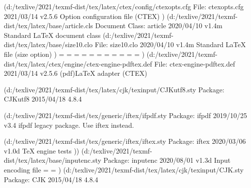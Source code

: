 (d:/texlive/2021/texmf-dist/tex/latex/ctex/config/ctexopts.cfg
File: ctexopts.cfg 2021/03/14 v2.5.6 Option configuration file (CTEX)
)
(d:/texlive/2021/texmf-dist/tex/latex/base/article.cls
Document Class: article 2020/04/10 v1.4m Standard LaTeX document class
(d:/texlive/2021/texmf-dist/tex/latex/base/size10.clo
File: size10.clo 2020/04/10 v1.4m Standard LaTeX file (size option)
)
\c@part=
\c@section=
\c@subsection=
\c@subsubsection=
\c@paragraph=
\c@subparagraph=
\c@figure=
\c@table=
\abovecaptionskip=
\belowcaptionskip=
\bibindent=
)
(d:/texlive/2021/texmf-dist/tex/latex/ctex/engine/ctex-engine-pdftex.def
File: ctex-engine-pdftex.def 2021/03/14 v2.5.6 (pdf)LaTeX adapter (CTEX)

(d:/texlive/2021/texmf-dist/tex/latex/cjk/texinput/CJKutf8.sty
Package: CJKutf8 2015/04/18 4.8.4

(d:/texlive/2021/texmf-dist/tex/generic/iftex/ifpdf.sty
Package: ifpdf 2019/10/25 v3.4 ifpdf legacy package. Use iftex instead.

(d:/texlive/2021/texmf-dist/tex/generic/iftex/iftex.sty
Package: iftex 2020/03/06 v1.0d TeX engine tests
))
(d:/texlive/2021/texmf-dist/tex/latex/base/inputenc.sty
Package: inputenc 2020/08/01 v1.3d Input encoding file
\inpenc@prehook=
\inpenc@posthook=
)
(d:/texlive/2021/texmf-dist/tex/latex/cjk/texinput/CJK.sty
Package: CJK 2015/04/18 4.8.4

